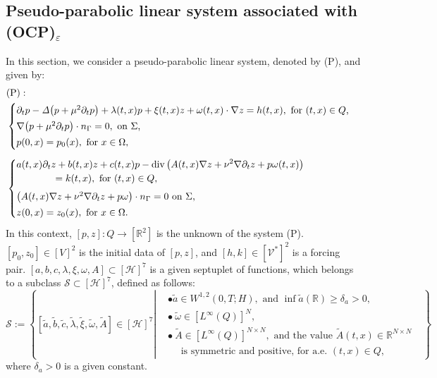 \documentclass{sinst}
\numberwithin{equation}{section}
\theoremstyle{plain}
\theoremstyle{definition}
\def\R{\mathbb{R}}
\def\sH{\mathscr{H}}
\def\sS{\mathscr{S}}
\def\sV{\mathscr{V}}
\def\ds{\displaystyle}
\begin{document}
\subsection{Pseudo-parabolic linear system associated with (OCP)$_\varepsilon$}
In this section, we consider a pseudo-parabolic linear system, denoted by (P), and given by:
  \begin{align}
      &\mbox{(P)}:
      \\
      & \begin{cases}
          \partial_t p -\mathit{\Delta} \bigl( p +\mu^2 \partial_t p \bigr) + \lambda(t,x) p + \xi(t,x) z + \omega(t,x) \cdot \nabla z = h(t, x), ~ \mbox{for $ (t, x) \in Q $,}
          \\[0.5ex]
          \nabla \bigl( p +\mu^2 \partial_t p \bigr) \cdot n_\Gamma =  0, ~ \mbox{on $ \Sigma $,}
          \
          \\[0.5ex]
          p(0, x) = p_0(x),~ \mbox{for $ x \in \Omega $,}
      \end{cases}
      \label{(P)1st}
      \\[1ex]
      & \begin{cases}
          \ds a(t,x) \partial_t z + b(t,x) z + c(t,x) p -\mathrm{div} \left( A(t,x) \nabla z + \nu^2 \nabla \partial_t z + p \omega(t,x) \right) 
          \\
          \qquad\qquad = k(t, x), ~ \mbox{for $ (t, x) \in Q $,}
          \\[1ex]
          \left( A(t,x) \nabla z + \nu^2 \nabla \partial_t z + p \omega \right) \cdot n_\Gamma = 0 ~ \mbox{on $ \Sigma $,}
          \\[0.5ex]
          z(0, x) = z_0(x),~ \mbox{for $ x \in \Omega $.}
      \end{cases}
      \label{(P)2nd}
  \end{align}
In this context, $[p,z]:Q \longrightarrow [\R^2]$ is the unknown of the system (P). $[p_0, z_0] \in [V]^2$ is the initial data of $[p,z]$, and $[h,k] \in [\sV^*]^2$ is a forcing pair. $[a,b,c,\lambda,\xi,\omega,A] \subset [\sH]^7$ is a given septuplet of functions, which belongs to a subclass $\sS \subset [\sH]^7$, defined as follows:
\begin{equation}
  \sS := \left\{ [\tilde a,\tilde b,\tilde c,\tilde \lambda,\tilde \xi,\tilde \omega,\tilde A] \in [\sH]^7 \left| \begin{aligned}
    &\bullet \tilde a \in W^{1,2}(0,T;H), \mbox{ and } \inf \tilde a(\R) \geq \delta_a > 0,
    \\
    &\bullet \ \tilde \omega \in [L^\infty(Q)]^N,
    \\
    &\bullet \ \tilde A \in [L^\infty(Q)]^{N \times N}, \mbox{ and the value $\tilde A(t,x) \in \R^{N \times N}$ } 
    \\
    &\quad \mbox{ is symmetric and positive, for a.e. $(t,x) \in Q$},
  \end{aligned} \right. \right\}
\end{equation}
where $\delta_a > 0$ is a given constant.
\end{document}
